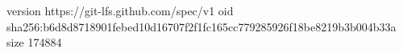 version https://git-lfs.github.com/spec/v1
oid sha256:b6d8d8718901febed10d16707f2f1fc165cc779285926f18be8219b3b004b33a
size 174884

